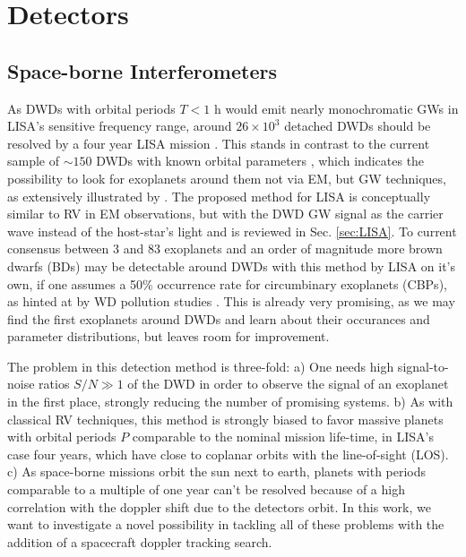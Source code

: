 \documentclass{aa}
\begin{document}
\section{Detectors}
\subsection{Space-borne Interferometers} \label{sec:spaceborne}
As DWDs with orbital periods $T < 1$ h would emit nearly monochromatic GWs in LISA's sensitive frequency range, around $26\times 10^3$ detached DWDs should be resolved by a four year LISA mission \citep{danielski}. This stands in contrast to the current sample of $\sim 150$ DWDs with known orbital parameters \citep{korol2022}, which indicates the possibility to look for exoplanets around them not via EM, but GW techniques, as extensively illustrated by \citep{tamanini,danielski,kang2021}. The proposed method for LISA is conceptually similar to RV in EM observations, but with the DWD GW signal as the carrier wave instead of the host-star's light and is reviewed in Sec. \ref{sec:LISA}. To current consensus between 3 and 83 exoplanets and an order of magnitude more brown dwarfs (BDs) may be detectable around DWDs with this method by LISA on it's own, if one assumes a 50\% occurrence rate for circumbinary exoplanets (CBPs), as hinted at by WD pollution studies \citep{danielski,kang2021}. This is already very promising, as we may find the first exoplanets around DWDs and learn about their occurances and parameter distributions, but leaves room for improvement.

The problem in this detection method is three-fold: a) One needs high signal-to-noise ratios $S/N \gg 1$ of the DWD in order to observe the signal of an exoplanet in the first place, strongly reducing the number of promising systems. b) As with classical RV techniques, this method is strongly biased to favor massive planets with orbital periods $P$ comparable to the nominal mission life-time, in LISA's case four years, which have close to coplanar orbits with the line-of-sight (LOS). c) As space-borne missions orbit the sun next to earth, planets with periods comparable to a multiple of one year can't be resolved because of a high correlation with the doppler shift due to the detectors orbit. In this work, we want to investigate a novel possibility in tackling all of these problems with the addition of a spacecraft doppler tracking search.
\end{document}
